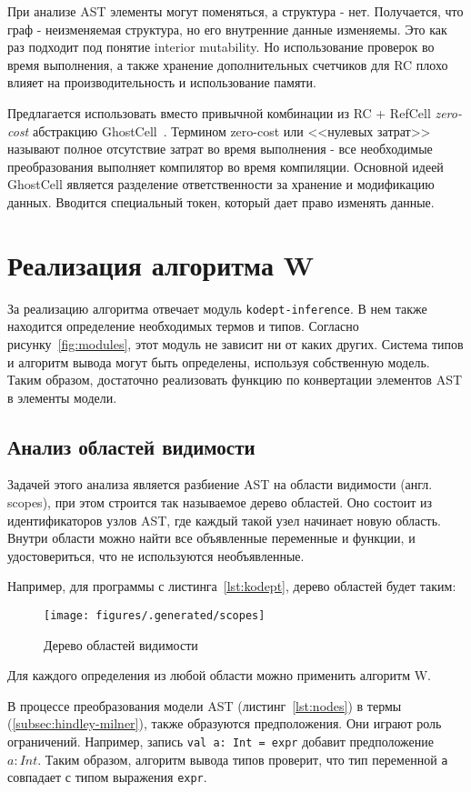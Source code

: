 При анализе AST элементы могут поменяться, а структура - нет.
Получается, что граф - неизменяемая структура, но его внутренние данные изменяемы.
Это как раз подходит под понятие interior mutability.
Но использование проверок во время выполнения, а также хранение дополнительных счетчиков для RC плохо влияет на производительность и использование памяти.

Предлагается использовать вместо привычной комбинации из RC + RefCell \textit{zero-cost} абстракцию GhostCell~\cite{GhostCell}.
Термином zero-cost или <<нулевых затрат>> называют полное отсутствие затрат во время выполнения - все необходимые преобразования выполняет компилятор во время компиляции.
Основной идеей GhostCell является разделение ответственности за хранение и модификацию данных.
Вводится специальный токен, который дает право изменять данные.

\section{Реализация алгоритма W}
\label{sec:algorithm_W}

За реализацию алгоритма отвечает модуль \lstinline{kodept-inference}.
В нем также находится определение необходимых термов и типов.
Согласно рисунку~\ref{fig:modules}, этот модуль не зависит ни от каких других.
Система типов и алгоритм вывода могут быть определены, используя собственную модель.
Таким образом, достаточно реализовать функцию по конвертации элементов AST в элементы модели.

\subsection{Анализ областей видимости}
\label{subsec:scope_analysis}

Задачей этого анализа является разбиение AST на области видимости (англ. scopes), при этом строится так называемое дерево областей.
Оно состоит из идентификаторов узлов AST, где каждый такой узел начинает новую область.
Внутри области можно найти все объявленные переменные и функции, и удостовериться, что не используются необъявленные.

Например, для программы с листинга~\ref{lst:kodept}, дерево областей будет таким:

\begin{figure}
    \centering
    \texttt{[image: figures/.generated/scopes]}
    \caption{Дерево областей видимости}
    \label{fig:scopes}
\end{figure}

Для каждого определения из любой области можно применить алгоритм W.

В процессе преобразования модели AST (листинг~\ref{lst:nodes}) в термы (\ref{subsec:hindley-milner}), также образуются предположения.
Они играют роль ограничений.
Например, запись \lstinline{val a: Int = expr} добавит предположение $a: Int$.
Таким образом, алгоритм вывода типов проверит, что тип переменной \lstinline{a} совпадает с типом выражения \lstinline{expr}.

